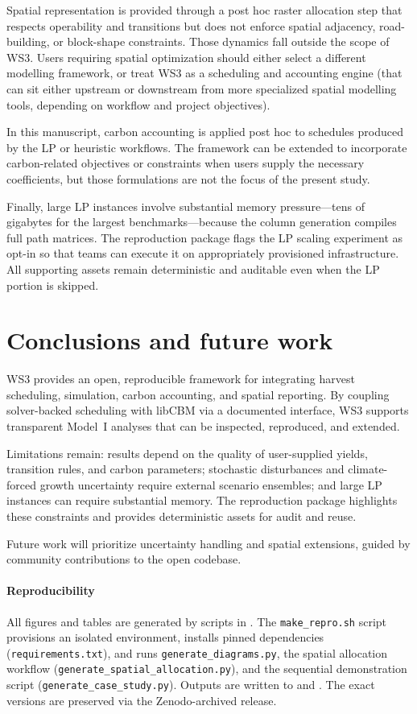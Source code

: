 \documentclass[review]{elsarticle}
\begin{document}
Spatial representation is provided through a post hoc raster allocation step that respects operability and transitions but does not enforce spatial adjacency, road-building, or block-shape constraints. Those dynamics fall outside the scope of WS3. Users requiring spatial optimization should either select a different modelling framework, or treat WS3 as a scheduling and accounting engine (that can sit either upstream or downstream from more specialized spatial modelling tools, depending on workflow and project objectives).

In this manuscript, carbon accounting is applied post hoc to schedules produced by the LP or heuristic workflows. The framework can be extended to incorporate carbon-related objectives or constraints when users supply the necessary coefficients, but those formulations are not the focus of the present study.

Finally, large LP instances involve substantial memory pressure—tens of gigabytes for the largest benchmarks—because the column generation compiles full path matrices. The reproduction package flags the LP scaling experiment as opt-in so that teams can execute it on appropriately provisioned infrastructure. All supporting assets remain deterministic and auditable even when the LP portion is skipped.

\section{Conclusions and future work}
WS3 provides an open, reproducible framework for integrating harvest scheduling, simulation, carbon accounting, and spatial reporting. By coupling solver-backed scheduling with libCBM via a documented interface, WS3 supports transparent Model~I analyses that can be inspected, reproduced, and extended.

Limitations remain: results depend on the quality of user-supplied yields, transition rules, and carbon parameters; stochastic disturbances and climate-forced growth uncertainty require external scenario ensembles; and large LP instances can require substantial memory. The reproduction package highlights these constraints and provides deterministic assets for audit and reuse.

Future work will prioritize uncertainty handling and spatial extensions, guided by community contributions to the open codebase.

\paragraph{Reproducibility}
All figures and tables are generated by scripts in . The \texttt{make\_repro.sh} script provisions an isolated environment, installs pinned dependencies (\texttt{requirements.txt}), and runs \texttt{generate\_diagrams.py}, the spatial allocation workflow (\texttt{generate\_spatial\_allocation.py}), and the sequential demonstration script (\texttt{generate\_case\_study.py}). Outputs are written to  and . The exact versions are preserved via the Zenodo-archived release.
\end{document}
